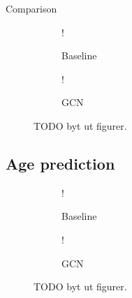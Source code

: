 Comparison


\begin{figure}[H]
    \centering
        \begin{subfigure}{.5\textwidth}
            \centering
            \begin{center}
                 {!} {
                    
                }
            \end{center}
            \caption{Baseline}
            \label{fig:comparison_sex_naive}
        \end{subfigure}%
        \begin{subfigure}{.5\textwidth}
            \centering
            \begin{center}
                 {!} {
                    
                }
            \end{center}
            \caption{GCN}
            \label{fig:comparison_sex_zorro}
        \end{subfigure}
    \caption{TODO byt ut figurer.}
    \label{fig:comparison_sex}
\end{figure}



\subsection{Age prediction}

\begin{figure}[H]
    \centering
        \begin{subfigure}{.5\textwidth}
            \centering
            \begin{center}
                 {!} {
                    
                }
            \end{center}
            \caption{Baseline}
            \label{fig:naive_age_baseline}
        \end{subfigure}%
        \begin{subfigure}{.5\textwidth}
            \centering
            \begin{center}
                 {!} {
                    
                }
            \end{center}
            \caption{GCN}
            \label{fig:naive_age_gcn}
        \end{subfigure}
    \caption{TODO byt ut figurer.}
    \label{fig:naive_age}
\end{figure}



